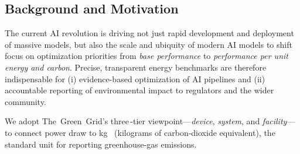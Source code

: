 




\subsection{Background and Motivation}
\label{sec:energy:background}



The current AI revolution is driving not just rapid development and deployment of massive models, but also the scale and ubiquity of modern AI models to shift focus on optimization priorities from \emph{base performance} to \emph{performance \textit{per unit energy and carbon}}. Precise, transparent energy benchmarks are therefore indispensable for (i) evidence-based optimization of AI pipelines and (ii) accountable reporting of environmental impact to regulators and the wider community. 

We adopt The~Green~Grid's three\,-tier viewpoint—\emph{device}, \emph{system}, and \emph{facility}—to connect power draw to \si{\kilogram\COtwoe} (kilograms of carbon‑dioxide equivalent), the standard unit for reporting greenhouse‑gas emissions.



\newcommand{\headerfont}{\fontsize{10pt}{12pt}\selectfont\bfseries}

